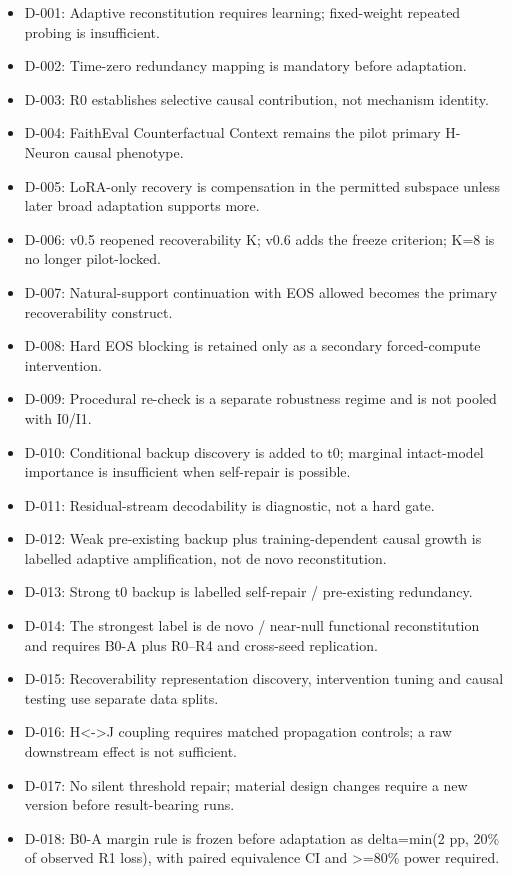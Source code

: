 \begin{itemize}
\tightlist
\item D-001: Adaptive reconstitution requires learning; fixed-weight repeated probing is insufficient.
\item D-002: Time-zero redundancy mapping is mandatory before adaptation.
\item D-003: R0 establishes selective causal contribution, not mechanism identity.
\item D-004: FaithEval Counterfactual Context remains the pilot primary H-Neuron causal phenotype.
\item D-005: LoRA-only recovery is compensation in the permitted subspace unless later broad adaptation supports more.
\item D-006: v0.5 reopened recoverability K; v0.6 adds the freeze criterion; K=8 is no longer pilot-locked.
\item D-007: Natural-support continuation with EOS allowed becomes the primary recoverability construct.
\item D-008: Hard EOS blocking is retained only as a secondary forced-compute intervention.
\item D-009: Procedural re-check is a separate robustness regime and is not pooled with I0/I1.
\item D-010: Conditional backup discovery is added to t0; marginal intact-model importance is insufficient when self-repair is possible.
\item D-011: Residual-stream decodability is diagnostic, not a hard gate.
\item D-012: Weak pre-existing backup plus training-dependent causal growth is labelled adaptive amplification, not de novo reconstitution.
\item D-013: Strong t0 backup is labelled self-repair / pre-existing redundancy.
\item D-014: The strongest label is de novo / near-null functional reconstitution and requires B0-A plus R0--R4 and cross-seed replication.
\item D-015: Recoverability representation discovery, intervention tuning and causal testing use separate data splits.
\item D-016: H<->J coupling requires matched propagation controls; a raw downstream effect is not sufficient.
\item D-017: No silent threshold repair; material design changes require a new version before result-bearing runs.
\item D-018: B0-A margin rule is frozen before adaptation as delta=min(2 pp, 20\% of observed R1 loss), with paired equivalence CI and >=80\% power required.

\end{itemize}
